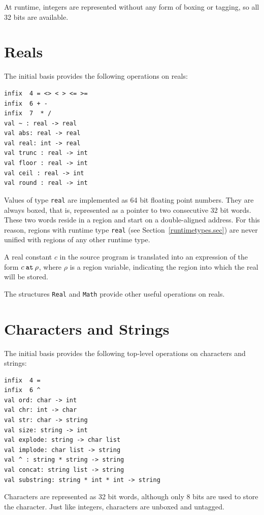 \documentclass[12pt]{book}
\begin{document}
At runtime, integers are represented without any form of boxing or tagging, so
all 32 bits are available. 

\section{Reals}
The initial basis provides the following operations on reals:
\index{{\tt =}}\index{{\tt <>}}\index{{\tt <}}\index{{\tt >}}\index{{\tt <=}}\index{{\tt >=}}\index{{\tt +}}\index{{\tt -}}\index{{\tt *}}\index{{\tt /}}\index{\verb+~+}
\begin{verbatim}
infix  4 = <> < > <= >= 
infix  6 + - 
infix  7  * /
val ~ : real -> real
val abs: real -> real
val real: int -> real
val trunc : real -> int
val floor : real -> int
val ceil : real -> int
val round : real -> int
\end{verbatim}
Values of type {\tt real} are implemented as 64 bit floating point
numbers.  They are always boxed, that is, represented as a pointer to
two consecutive 32 bit words.  These two words reside
in a region and start on a double-aligned address. For this reason,
regions with runtime type {\tt real} (see
Section~\ref{runtimetypes.sec}) are never unified with regions of any
other runtime type.

A real constant $c$ in the source program is translated into an
expression of the form $c\mathbin{\hbox{\tt at}}\rho$, where $\rho$ is
a region variable, indicating the region into which the real will be
stored.

The structures {\tt Real} and {\tt Math} provide other useful
operations on reals.

\section{Characters and Strings}
The initial basis provides the following top-level operations on characters and strings:\index{{\tt =}}\index{\verb+^+}
\begin{verbatim}
infix  4 = 
infix  6 ^
val ord: char -> int
val chr: int -> char
val str: char -> string
val size: string -> int
val explode: string -> char list
val implode: char list -> string
val ^ : string * string -> string
val concat: string list -> string
val substring: string * int * int -> string
\end{verbatim}
Characters are represented as 32 bit words, although only 8 bits are
used to store the character. Just like integers, characters are
unboxed and untagged.
\end{document}
